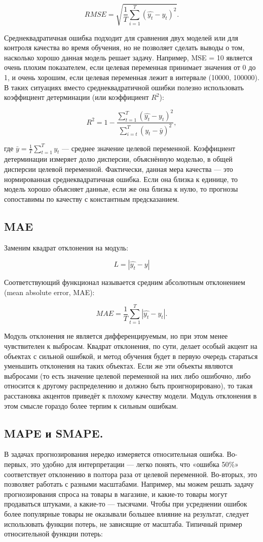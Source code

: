 \[
  RMSE = \sqrt{\frac{1}{T} \sum_{i=1}^{T} (\hat{y_t} - y_t)^2}.
\]

Среднеквадратичная ошибка подходит для сравнения двух моделей или для
контроля качества во время обучения, но не позволяет сделать выводы о
том, насколько хорошо данная модель решает задачу. Например, MSE = 10
является очень плохим показателем, если целевая переменная принимает
значения от 0 до 1, и очень хорошим, если целевая переменная лежит в
интервале (10000, 100000). В таких ситуациях вместо
среднеквадратичной ошибки полезно использовать коэффициент
детерминации (или коэффициент $R^2$):

\[
  R^2 = 1 - \frac{\sum_{t=1}^{T} (\hat{y_t} -
  y_t)^2}{\sum_{i=t}^{T} (y_t - \bar{y})^2},
\]

где $\bar{y} = \frac{1}{T} \sum_{t=1}^{T} y_t$ — среднее значение
целевой переменной. Коэффициент детерминации измеряет долю дисперсии,
объяснённую моделью, в общей дисперсии целевой переменной.
Фактически, данная мера качества — это нормированная
среднеквадратичная ошибка. Если она близка к единице, то модель
хорошо объясняет данные, если же она близка к нулю, то прогнозы
сопоставимы по качеству с константным предсказанием.

\subsection*{MAE}
Заменим квадрат отклонения на модуль:

\[
  L = |\hat{y_t} - y|
\]

Соответствующий функционал называется средним абсолютным отклонением
(mean absolute error, MAE):

\[
  MAE = \frac{1}{T} \sum_{t=1}^{T} |\hat{y_t} - y_t|.
\]

Модуль отклонения не является дифференцируемым, но при этом менее
чувствителен к выбросам. Квадрат отклонения, по сути, делает особый
акцент на объектах с сильной ошибкой, и метод обучения будет в первую
очередь стараться уменьшить отклонения на таких объектах. Если же эти
объекты являются выбросами (то есть значение целевой переменной на
  них либо ошибочно, либо относится к другому распределению и должно
быть проигнорировано), то такая расстановка акцентов приведёт к
плохому качеству модели. Модуль отклонения в этом смысле гораздо
более терпим к сильным ошибкам.

\subsection*{MAPE и SMAPE.}
В задачах прогнозирования нередко измеряется
относительная ошибка. Во-первых, это удобно для интерпретации — легко
понять, что «ошибка 50\%» соответствует отклонению в полтора раза от
целевой переменной. Во-вторых, это позволяет работать с разными
масштабами. Например, мы можем решать задачу прогнозирования спроса
на товары в магазине, и какие-то товары могут продаваться штуками, а
какие-то — тысячами. Чтобы при усреднении ошибок более популярные
товары не оказывали большее влияние на результат, следует
использовать функции потерь, не зависящие от масштаба. Типичный
пример относительной функции потерь:

